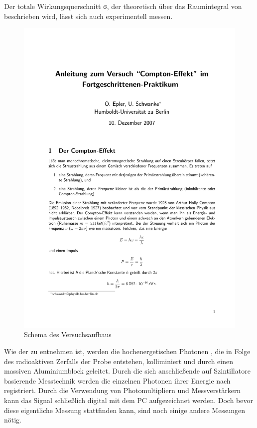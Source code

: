Der totale Wirkungsquerschnitt σ, der theoretisch über das Raumintegral von
 beschrieben wird, lässt sich auch experimentell messen.
\begin{figure}[htb]
      \centering
      \includegraphics[page=6,width=1\columnwidth,keepaspectratio,viewport=81 397 504 635,clip,]{../docs/compton}
      \caption{Schema des Versuchsaufbaus}
      \label{fig:aufbau}
\end{figure}

Wie der  zu entnehmen ist, werden die hochenergetischen Photonen
, die in Folge des radioaktiven Zerfalls der Probe entstehen, kolliminiert und
durch einen massiven Aluminiumblock geleitet. Durch die sich anschließende
auf Szintillatore basierende Messtechnik werden die einzelnen Photonen ihrer
Energie nach registriert. Durch die Verwendung von Photomultipliern und
Messverstärkern kann das Signal schließlich digital mit dem PC aufgezeichnet
werden. Doch bevor diese eigentliche Messung stattfinden kann, sind noch einige
andere Messungen nötig.

